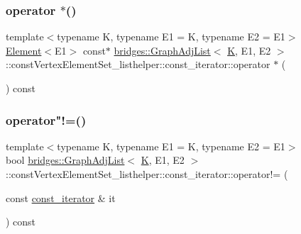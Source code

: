 \subsubsection{\texorpdfstring{operator $\ast$()}{operator *()}}
{\footnotesize\ttfamily template$<$typename K, typename E1 = K, typename E2 = E1$>$ \\
\mbox{\hyperlink{classbridges_1_1_element}{Element}}$<$E1$>$ const$\ast$ \mbox{\hyperlink{classbridges_1_1_graph_adj_list}{bridges\+::\+Graph\+Adj\+List}}$<$ \mbox{\hyperlink{namespacebridges_acfb0a4f7877d8f63de3e6862004c50edaa5f3c6a11b03839d46af9fb43c97c188}{K}}, E1, E2 $>$\+::const\+Vertex\+Element\+Set\+\_\+listhelper\+::const\+\_\+iterator\+::operator $\ast$ (\begin{DoxyParamCaption}{ }\end{DoxyParamCaption}) const\hspace{0.3cm}{\ttfamily [inline]}}

\mbox{\label{classbridges_1_1_graph_adj_list_1_1const_vertex_element_set__listhelper_1_1const__iterator_abf8be34e9256e09beb06980163182cc0}} 
\subsubsection{\texorpdfstring{operator"!=()}{operator!=()}}
{\footnotesize\ttfamily template$<$typename K, typename E1 = K, typename E2 = E1$>$ \\
bool \mbox{\hyperlink{classbridges_1_1_graph_adj_list}{bridges\+::\+Graph\+Adj\+List}}$<$ \mbox{\hyperlink{namespacebridges_acfb0a4f7877d8f63de3e6862004c50edaa5f3c6a11b03839d46af9fb43c97c188}{K}}, E1, E2 $>$\+::const\+Vertex\+Element\+Set\+\_\+listhelper\+::const\+\_\+iterator\+::operator!= (\begin{DoxyParamCaption}\item[{const \mbox{\hyperlink{classbridges_1_1_graph_adj_list_1_1const_vertex_element_set__listhelper_1_1const__iterator}{const\+\_\+iterator}} \&}]{it }\end{DoxyParamCaption}) const\hspace{0.3cm}{\ttfamily [inline]}}

